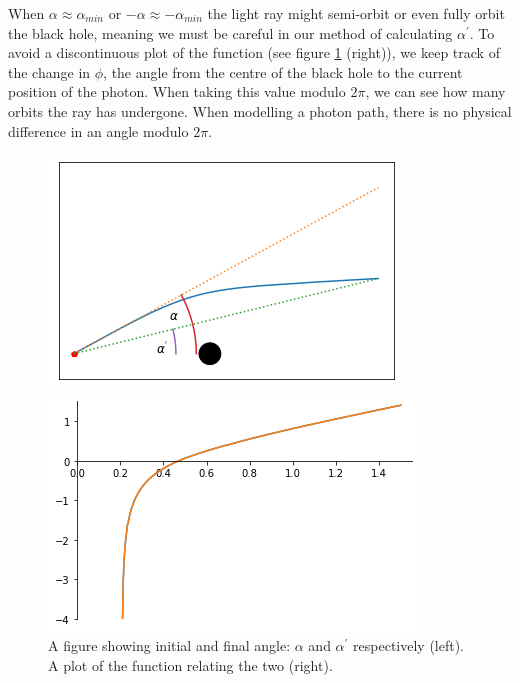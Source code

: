 \documentclass[oneside,openright,frontopenright, singlespacing]{dmathesis}
\begin{document}
\vspace{1em}
	When $\alpha \approx \alpha_{min}$ or $-\alpha \approx -\alpha_{min}$ the light ray might semi-orbit or even fully orbit the black hole, meaning we must be careful in our method of calculating $\alpha^{'}$. To avoid a discontinuous plot of the function (see figure \ref{fig:Figure3.3} (right)), we keep track of the change in $\phi$, the angle from the centre of the black hole to the current position of the photon. When taking this value modulo $2\pi$, we can see how many orbits the ray has undergone. When modelling a photon path, there is no physical difference in an angle modulo $2\pi$.

\begin{figure}[!ht]
	\centering
	\begin{minipage}{0.5\textwidth}
		\centering
		\includegraphics[height=0.5\linewidth]{img/alpha_alpha-prime}
	\end{minipage}%
	\hfill
	\begin{minipage}{0.5\textwidth}
		\centering
		\includegraphics[height=0.5\linewidth]{img/alpha-prime_f(alpha)}
	\end{minipage}
	\caption{A figure showing initial and final angle: $\alpha$ and $\alpha^{'}$ respectively (left). A plot of the function relating the two (right).}
	\label{fig:Figure3.3}
\end{figure}
\end{document}
